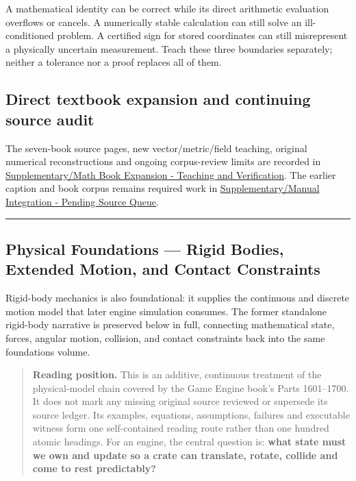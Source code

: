 A mathematical identity can be correct while its direct arithmetic evaluation overflows or cancels. A numerically stable calculation can still solve an ill-conditioned problem. A certified sign for stored coordinates can still misrepresent a physically uncertain measurement. Teach these three boundaries separately; neither a tolerance nor a proof replaces all of them.

\subsection{Direct textbook expansion and continuing source audit}\label{02-foundations-ii-ch039-direct-textbook-expansion-and-continuing-source-audit}

\hypertarget{02-foundations-ii-ch039-direct-textbook-expansion-and-continuing-source-audit}{}

The seven-book source pages, new vector/metric/field teaching, original numerical reconstructions and ongoing corpus-review limits are recorded in \hyperref[appendix-5056f3debc1f]{Supplementary/Math Book Expansion - Teaching and Verification}. The earlier caption and book corpus remains required work in \hyperref[appendix-ac1f51db5e9a]{Supplementary/Manual Integration - Pending Source Queue}.

\begin{center}\rule{0.5\linewidth}{0.5pt}\end{center}

\subsection{Physical Foundations --- Rigid Bodies, Extended Motion, and Contact Constraints}\label{02-foundations-ii-ch039-physical-foundations-rigid-bodies-extended-motion-and-contact-constraints}

\hypertarget{02-foundations-ii-ch039-physical-foundations-rigid-bodies-extended-motion-and-contact-constraints}{}

Rigid-body mechanics is also foundational: it supplies the continuous and discrete motion model that later engine simulation consumes. The former standalone rigid-body narrative is preserved below in full, connecting mathematical state, forces, angular motion, collision, and contact constraints back into the same foundations volume.

\begin{quote}
\textbf{Reading position.} This is an additive, continuous treatment of the physical-model chain covered by the Game Engine book's Parts 1601--1700. It does not mark any missing original source reviewed or supersede its source ledger. Its examples, equations, assumptions, failures and executable witness form one self-contained reading route rather than one hundred atomic headings. For an engine, the central question is: \textbf{what state must we own and update so a crate can translate, rotate, collide and come to rest predictably?}
\end{quote}

